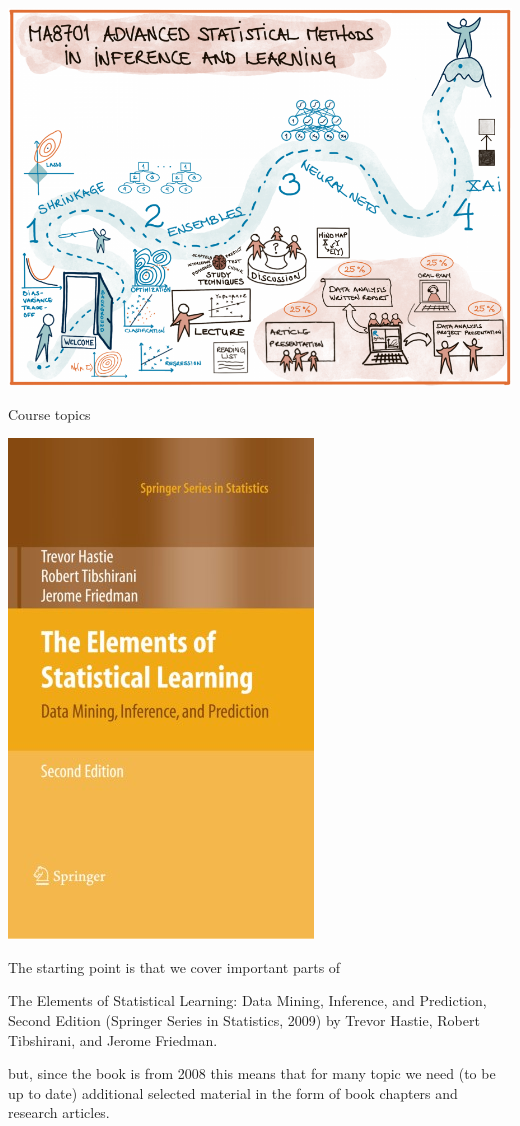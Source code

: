 \documentclass[
  ignorenonframetext,
]{beamer}
\begin{document}
\begin{frame}

\includegraphics{./overviewv1.png}

\end{frame}

\begin{frame}{Course topics}
\protect\hypertarget{course-topics}{}

\begin{flushleft}\includegraphics[width=0.2\linewidth]{ELSbookcover} \end{flushleft}

The starting point is that we cover important parts of

The Elements of Statistical Learning: Data Mining, Inference, and
Prediction, Second Edition (Springer Series in Statistics, 2009) by
Trevor Hastie, Robert Tibshirani, and Jerome Friedman.

but, since the book is from 2008 this means that for many topic we need
(to be up to date) additional selected material in the form of book
chapters and research articles.

\end{frame}
\end{document}
